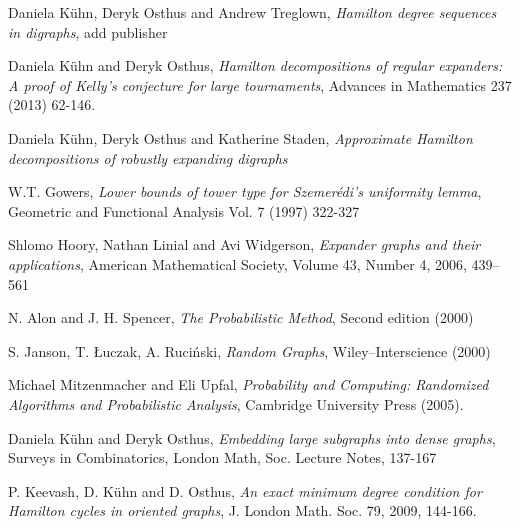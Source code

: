 \documentclass[10pt,letterpaper, reqno]{amsart}
\theoremstyle{definition}
\numberwithin{equation}{section}
\begin{document}
\begin{thebibliography}{10}
	Daniela K\"{u}hn, Deryk Osthus and Andrew Treglown, \textit{Hamilton degree sequences in digraphs}, add publisher
	
	Daniela K\"{u}hn and Deryk Osthus, \textit{Hamilton decompositions of regular expanders: A proof of Kelly's conjecture for large tournaments}, Advances in Mathematics 237 (2013) 62-146.
	
	Daniela K\"{u}hn, Deryk Osthus and Katherine Staden, 
	\textit{Approximate Hamilton decompositions of robustly expanding digraphs}
	
	W.T. Gowers, \textit{Lower bounds of tower type for Szemer\'{e}di's uniformity lemma}, Geometric and Functional Analysis Vol. 7 (1997) 322-327
	
	Shlomo Hoory, Nathan Linial and Avi Widgerson,
	\textit{Expander graphs and their applications},
	American Mathematical Society, Volume 43, Number 4, 2006, 439–561
	
	N. Alon and J. H. Spencer, 
	\textit{The Probabilistic Method}, Second edition (2000)
	
	S. Janson, T. \L{}uczak, A. Ruci\'{n}ski, 
	\textit{Random Graphs}, Wiley–Interscience (2000)
	
	Michael Mitzenmacher and Eli Upfal, \textit{Probability and Computing: Randomized Algorithms and Probabilistic Analysis}, Cambridge University Press (2005). 
	
	Daniela K\"{u}hn and Deryk Osthus,
	\textit{Embedding large subgraphs into dense graphs},
	Surveys in Combinatorics, London Math, Soc. Lecture Notes, 137-167
	
	P. Keevash, D. K\"{u}hn and D. Osthus,
	\textit{An exact minimum degree condition for Hamilton cycles in oriented graphs},
	J. London Math. Soc. 79, 2009, 144-166.
\end{thebibliography}	
\end{document}
